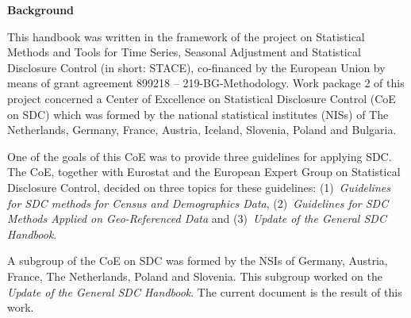 	\vfill %
	
	\newpage 

	

		
	\noindent \textbf{\large Background}\bigskip

	\justifying

	\noindent This handbook was written in the framework of the project on Statistical Methods and Tools
	 for Time Series, Seasonal Adjustment and Statistical Disclosure Control (in short: STACE), 
	 co-financed by the European Union by means of grant agreement 899218 -- 219-BG-Methodology. 
	 Work package 2 of this project concerned a Center of Excellence on Statistical Disclosure Control (CoE on SDC)
	  which was formed by the national statistical institutes (NISs) of The Netherlands, Germany, France, Austria, 
	  Iceland, Slovenia, Poland and Bulgaria.

	One of the goals of this CoE was to provide three guidelines for applying SDC. 
	The CoE, together with Eurostat and the European Expert Group on Statistical Disclosure Control, 
	decided on three topics for these guidelines: (1)~\textit{Guidelines for SDC methods for Census and Demographics Data},
	 (2)~\textit{Guidelines for SDC Methods Applied on Geo-Referenced Data} and (3)~\textit{Update of the General SDC Handbook}.

	A subgroup of the CoE on SDC was formed by the NSIs of Germany, Austria, France, The Netherlands, Poland and Slovenia. 
	This subgroup worked on the \textit{Update of the General SDC Handbook}. The current document is the result of this work.

	\vfill
